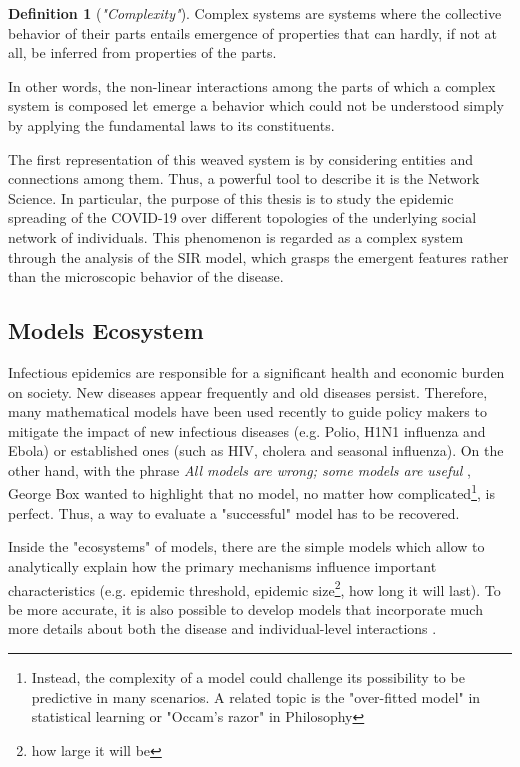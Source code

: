 \documentclass[a4paper,10pt,twoside]{book} %
\theoremstyle{definition}
\newtheorem{definition}{Definition}[section]
\begin{document}
\begin{definition}[\textit{"Complexity"}]
Complex systems are systems where the collective behavior of their parts entails emergence of properties that can hardly, if not at all, be inferred from properties of the parts.
\end{definition}

In other words, the non-linear interactions among the parts of which a complex system is composed let emerge a behavior which could not be understood simply by applying the fundamental laws to its constituents.

The first representation of this weaved system is by considering entities and connections among them. Thus, a powerful tool to describe it is the Network Science.
In particular, the purpose of this thesis is to study the epidemic spreading of the COVID-19 over different topologies of the underlying social network of individuals. This phenomenon is regarded as a complex system through the analysis of the SIR model, which grasps the emergent features rather than the microscopic behavior of the disease.

\subsection{Models Ecosystem}
Infectious epidemics are responsible for a significant health and economic burden on society. New diseases appear frequently and old diseases persist. Therefore, many mathematical models have been used recently to guide policy makers to mitigate the impact of new infectious diseases (e.g. Polio, H1N1 influenza and Ebola) or established ones (such as HIV, cholera and seasonal influenza).
On the other hand, with the phrase \textit{All models are wrong; some models are useful} \cite{Box::2005_StatDesign}, George Box wanted to highlight that no model, no matter how complicated\footnote{Instead, the complexity of a model could challenge its possibility to be predictive in many scenarios. A related topic is the "over-fitted model" in statistical learning or "Occam's razor" in Philosophy}, is perfect. Thus, a way to evaluate a "successful" model has to be recovered.

Inside the "ecosystems" of models, there are the simple models which allow to analytically explain how the primary mechanisms influence important characteristics (e.g. epidemic threshold, epidemic size\footnote{how large it will be}, how long it will last). To be more accurate, it is also possible to develop models that incorporate much more details about both the disease and individual-level interactions \cite{Kiss::MathOfEpiOnNet}.
\end{document}
